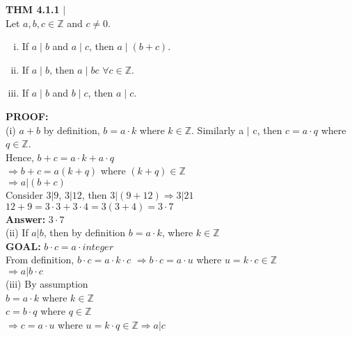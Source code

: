 \documentclass [12pt]{article}
\begin{document}
\begin{framed}
\textbf{THM 4.1.1} $|$ \\
Let $a, b, c \in \mathbb{Z}$ and $c\neq 0$. \\
\begin{enumerate}[(i)]
\item If $a \; | \; b$ and $a\;|\;c$, then $a\;|\;(b + c)$.
\item If $a \; | \; b$, then $a\;|\;bc$ $\forall c \in \mathbb{Z}$.
\item If $a \;|\; b$ and $b\;|\;c$, then $a\;|\;c$.
\end{enumerate}
\end{framed}
\raggedright
\textbf{PROOF:} \\
\quad(i) $a + b$ by definition, $b = a \cdot k$ where $k\in\mathbb{Z}$. Similarly a $|$ c, then $c = a \cdot q$ where $q\in\mathbb{Z}$.\\
\quad\quad Hence, $b + c = a\cdot k + a \cdot q$\\
\quad\quad $\Rightarrow b + c = a (k + q)$ where $(k + q)\in\mathbb{Z}$\\
\quad\quad $\Rightarrow a | (b + c)$ \checkmark\\
\vspace{0.10in}
\quad\quad Consider $3|9$, $3|12$, then $3|(9+12) \Rightarrow 3|21$\\
\quad\quad\quad $12 + 9 = 3\cdot3 + 3\cdot4 = 3(3+4) = 3\cdot7$\\
\quad\quad\quad\textbf{Answer:} $3\cdot7$\\
\vspace{0.20in}
\quad (ii) If $a|b$, then by definition $b=a\cdot k$, where $k\in\mathbb{Z}$\\
\quad\quad \textbf{GOAL:} $b\cdot c = a\cdot integer$\\
\quad\quad From definition, $b\cdot c = a\cdot k\cdot c$ $\Rightarrow b\cdot c = a\cdot u$ where $u = k\cdot c \in \mathbb{Z}$\\
\quad\quad$\Rightarrow a | b\cdot c$\\
\vspace{0.20in}
\quad(iii) By assumption\\
\quad\quad $b = a\cdot k$ where $k\in\mathbb{Z}$\\
\quad\quad $c = b\cdot q$ where $q\in\mathbb{Z}$\\
\quad\quad $\Rightarrow c = a\cdot u$ where $u = k\cdot q \in\mathbb{Z}\Rightarrow a|c$
\vspace{0.25in}
\pagebreak
\end{document}
